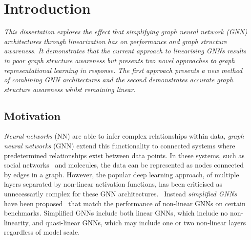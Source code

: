 \chapter{Introduction}


\emph{
    This dissertation explores the effect that simplifying graph neural network (GNN) architectures through linearization has on performance and graph structure awareness.
    It demonstrates that the current approach to linearising GNNs results in poor graph structure awareness but presents two novel approaches to graph representational learning in response.
    The first approach presents a new method of combining GNN architectures and the second demonstrates accurate graph structure awareness whilst remaining linear.
}

\section{Motivation}
\label{sec:motivation}





\emph{Neural networks} (NN) are able to infer complex relationships within data, \emph{graph neural networks} (GNN) extend this functionality to connected systems where predetermined relationships exist between data points.
In these systems, such as social networks~\cite{pmlr-v70-gilmer17a} and molecules\cite{DBLP:journals/corr/abs-1806-01973}, the data can be represented as nodes connected by edges in a graph.
However, the popular deep learning approach, of multiple layers separated by non-linear activation functions, has been criticised as unnecessarily complex for these GNN architectures.~\cite{wu2019simplifying}
Instead \emph{simplified GNNs} have been proposed~\cite{chanpuriya2022simplified,navarin2020linear,wu2019simplifying} that match the performance of non-linear GNNs on certain benchmarks.
Simplified GNNs include both linear GNNs, which include no non-linearity, and quasi-linear GNNs, which may include one or two non-linear layers regardless of model scale.


